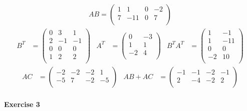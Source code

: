 \documentclass{article}
\begin{document}
\begin{align*}
    AB = \begin{pmatrix}
        1 & 1 & 0 & -2 \\
        7 & -11 & 0 & 7 \\
    \end{pmatrix}
\end{align*}
\begin{align*}
    B^T &= \begin{pmatrix}
        0 & 3 & 1 \\
        2 & -1 & -1 \\
        0 & 0 & 0 \\
        1 & 2 & 2 \\
    \end{pmatrix} &
    A^T &= \begin{pmatrix}
        0 & -3 \\
        1 & 1 \\
        -2 & 4 \\
    \end{pmatrix} &
    B^T A^T &= \begin{pmatrix}
        1 & -1 \\
        1 & -11 \\
        0 & 0 \\
        -2 & 10 \\
    \end{pmatrix}
\end{align*}
\begin{align*}
    AC &= \begin{pmatrix}
        -2 & -2 & -2 & 1 \\
        -5 & 7 & -2 & -5 \\
    \end{pmatrix} & 
    AB + AC &= \begin{pmatrix}
        -1 & -1 & -2 & -1 \\
        2 & -4 & -2 & 2 \\
    \end{pmatrix}
\end{align*}

\paragraph{Exercise 3}
\end{document}
